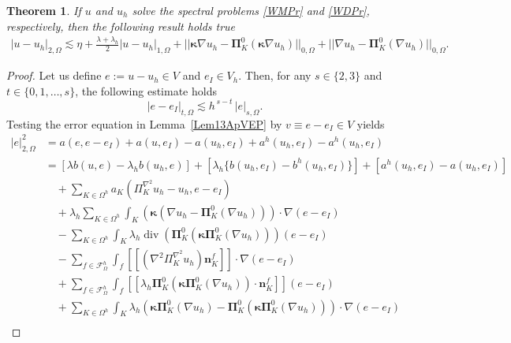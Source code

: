 \documentclass[final,reqno]{elsarticle}
\newtheorem{theorem}{Theorem}[section]
\newcommand\vdiv{\mathop{\mathrm{div}}\nolimits}
\newcommand\cF{\mathcal{F}}
\newcommand{\jump}[1]{[\![#1]\!]}
\def\bn{\boldsymbol{n}}
\def\bkappa{\boldsymbol{\kappa}}
\def\bPi{\mathbf{\Pi}}
\begin{document}
\begin{theorem}\label{teo14ApVEP}
    If  $u$ and $u_h$ solve the spectral problems \eqref{WMPr} and \eqref{WDPr}, respectively, then the  following result holds true
\begin{align}
    |u-u_h|_{2,\Omega}\lesssim \eta +  \frac{\lambda+\lambda_h}{2}|u-u_h|_{1,\Omega} +||\bkappa \nabla u_h-\bPi_K^0(\bkappa \nabla u_h)||_{0,\Omega} +||\nabla u_h -\bPi_K^0(\nabla u_h) ||_{0,\Omega}.\nonumber%
\end{align}
\end{theorem}
\begin{proof}
Let us define $e := u - u_h \in V$ and $e_I \in V_h$. Then, for any $s\in\{2,3\}$ and $t\in\{0,1,\ldots,s\}$, the following estimate holds
\begin{equation}\label{errorInterpolated}
|e - e_I|_{t,\Omega} \lesssim h^{\,s-t}\, |e|_{s,\Omega}.
\end{equation}
Testing the error equation in Lemma~\ref{Lem13ApVEP} by $v \equiv e - e_I \in V$ yields
\begin{align}
|e|_{2,\Omega}^2%
& = a(e,e-e_I)+a(u,e_I)-a(u_h,e_I) +  a^h(u_h,e_I)- a^h(u_h,e_I)\nonumber\\
   & = \left[\lambda b(u,e) - \lambda_h b(u_h,e)\right] + \left[ \lambda_h \big\{b(u_h,e_I)-b^h(u_h,e_I) \big\} \right] + \left[ a^h(u_h,e_I)-a(u_h,e_I) \right] \nonumber\\
   &\quad + \sum_{K\in \Omega^h} a_K(\Pi_K^{\nabla^2} u_h-u_h,e-e_I) \nonumber\\
   &\quad + \lambda_h \sum_{K\in \Omega^h} \int_K (\bkappa(\nabla u_h - \bPi_K^0 (\nabla u_h)))\cdot \nabla (e-e_I) \nonumber\\
   &\quad - \sum_{K\in \Omega^h} \int_{K}\lambda_h \vdiv\left( \bPi_K^0 (\bkappa \bPi_K^0(\nabla u_h))\right) (e-e_I) \nonumber\\ 
   &\quad - \sum_{f\in \cF^h_\Omega} \int_f \jump{(\nabla^2\Pi_K^{\nabla^2} u_h )\bn_K^f}\cdot \nabla (e-e_I)  \nonumber\\
   &\quad + \sum_{f\in \mathcal{F}^h_\Omega} \int_f \jump{\lambda_h\bPi_K^0(\bkappa \bPi_K^0(\nabla u_h ))\cdot \bn_K^{f}}(e-e_I)\nonumber \\
   &\quad + \sum_{K\in \Omega^h}\int_K \lambda_h \left(\bkappa \bPi_K^0(\nabla u_h)-\bPi_K^0(\bkappa \bPi_K^0(\nabla u_h))\right) \cdot \nabla (e-e_I)\nonumber\\

\end{align}
\end{proof}
\end{document}
